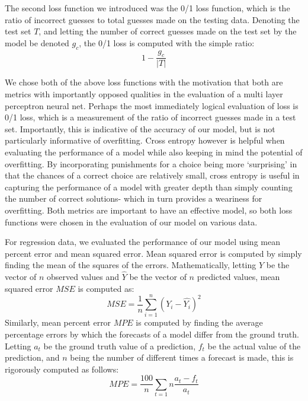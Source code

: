 \documentclass[twoside,11pt]{article}
\begin{document}
The second loss function we introduced was the 0/1 loss function, which is the ratio of incorrect guesses to total guesses made on the testing data.
Denoting the test set $T$, and letting the number of correct guesses made on the test set by the model be denoted $g_c$, the 0/1 loss is computed with the simple ratio:
\begin{equation}
	1 - \frac{g_c}{|T|}
\end{equation}

We chose both of the above loss functions with the motivation that both are metrics with importantly opposed qualities in the evaluation of a multi layer perceptron neural net. 
Perhaps the most immediately logical evaluation of loss is 0/1 loss, 
which is a measurement of the ratio of incorrect guesses made in a test set. Importantly, this is indicative of the accuracy of our model, but is not particularly informative of overfitting.
Cross entropy however is helpful when evaluating the performance of a model while also keeping in mind the potential of overfitting. By incorporating punishments for a choice being more 
`surprising' in that the chances of a correct choice are relatively small, cross entropy is useful in capturing the performance of a model with greater depth than simply counting the number of correct solutions- 
which in turn provides a weariness for overfitting.
Both metrics are important to have an effective model, so both loss functions were chosen in the evaluation of our model on various data.

For regression data, we evaluated the performance of our model using mean percent error and mean squared error. Mean squared error is computed by
simply finding the mean of the squares of the errors. Mathematically, letting $Y$ be the vector of $n$ observed values and $\hat{Y}$ be the vector of $n$ predicted
values, mean squared error $MSE$ is computed as:
\begin{equation}
MSE = \frac{1}{n} \sum_{i=1}^{n} (Y_i - \hat{Y_i})^2
\end{equation}
Similarly, mean percent error $MPE$ is computed by finding the average percentage errors by which the forecasts of a model differ from the ground truth. Letting $a_t$ be the 
ground truth value of a prediction, $f_t$ be the actual value of the prediction, and $n$ being the number of different times a forecast is made, this is rigorously
computed as follows:
\begin{equation}
MPE = \frac{100}{n} \sum_{t=1}{n} \frac{a_t - f_t}{a_t}
\end{equation}
\end{document}
